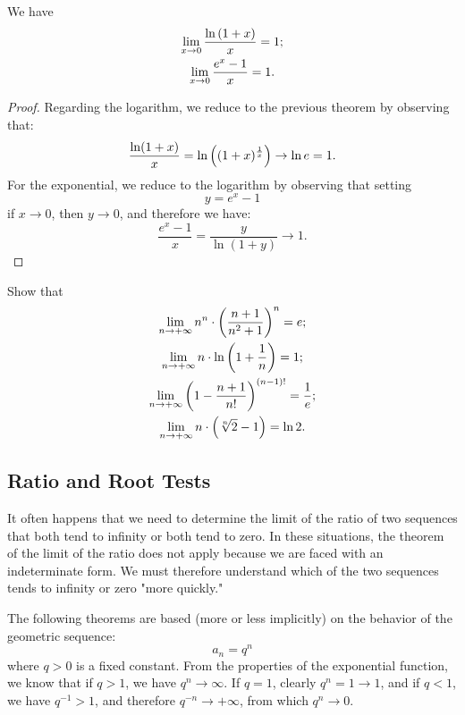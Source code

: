 \begin{corollary}\label{cor:limite_notevole_e}
\mymark{*}%
We have
\begin{gather}
 \lim_{x\to 0} \frac{\ln {\left( 1+ x \right)}}{x} = 1; \\
 \lim_{x\to 0} \frac{e^x-1}{x} = 1.
\end{gather}
\end{corollary}
%
\begin{proof}
Regarding the logarithm, we reduce to the previous theorem
by observing that:
\[
  \frac{\ln(1+x)}{x}
  = \ln {\left( (1+x)^{\frac 1 {x}} \right)}
  \to \ln e = 1.
\]
For the exponential, we reduce to the logarithm
by observing that setting
\[
  y = e^x-1
\]
if $x\to 0$, then $y\to 0$, and therefore we have:
\[
\frac{e^{x}-1}{x} = \frac{y}{\ln(1+y)} \to 1.
\]

\end{proof}

\begin{exercise}
Show that
\begin{gather*}
  \lim_{n\to+\infty} n^n\cdot {\left( \frac{n+1}{n^2+1} \right)}^n = e; \\
  \lim_{n\to+\infty} n\cdot \ln{\left( 1 + \frac 1 n \right)} = 1; \\
  \lim_{n\to+\infty} {\left( 1-\frac{n+1}{n!} \right)}^{(n-1)!} = \frac 1 e; \\
  \lim_{n\to+\infty} n \cdot {\left( \sqrt[n]{2}-1 \right)} = \ln 2.
\end{gather*}
\end{exercise}

\subsection{Ratio and Root Tests}

It often happens that we need to determine the limit
of the ratio of two sequences that both tend to infinity
or both tend to zero.
In these situations, the theorem of the limit of the ratio does not
apply because we are faced with an indeterminate form.
We must therefore understand which of the two sequences
tends to infinity or zero "more quickly."

The following theorems are based (more or less implicitly)
on the behavior of the geometric sequence:
\[
  a_n = q^n
\]
where $q>0$ is a fixed constant.
From the properties of the exponential function, 
we know that if $q>1$, we have $q^n\to \infty$.
If $q=1$, clearly $q^n=1\to 1$,
and if $q<1$, we have $q^{-1}>1$, and therefore $q^{-n} \to +\infty$,
from which $q^n \to 0$.

